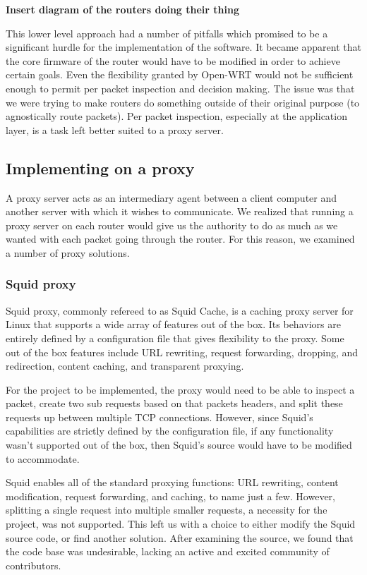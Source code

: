 \documentclass[12pt]{article}
\newcommand{\comment}[1]
{{\bfseries \color{blue} #1}}
\begin{document}
		\comment{Insert diagram of the routers doing their thing}

		This lower level approach had a number of pitfalls which promised to be a significant hurdle for the implementation of the software. It became apparent that the core firmware of the router would have to be modified in order to achieve certain goals. Even the flexibility granted by Open-WRT would not be sufficient enough to permit per packet inspection and decision making. The issue was that we were trying to make routers do something outside of their original purpose (to agnostically route packets). Per packet inspection, especially at the application layer, is a task left better suited to a proxy server.



	\subsection{Implementing on a proxy}

		A proxy server acts as an intermediary agent between a client computer and another server with which it wishes to communicate. We realized that running a proxy server on each router would give us the authority to do as much as we wanted with each packet going through the router. For this reason, we examined a number of proxy solutions. 

		\subsubsection{Squid proxy}

			Squid proxy, commonly refereed to as Squid Cache, is a caching proxy server for Linux that supports a wide array of features out of the box. Its behaviors are entirely defined by a configuration file that gives flexibility to the proxy. Some out of the box features include URL rewriting, request forwarding, dropping, and redirection, content caching, and transparent proxying.

			For the project to be implemented, the proxy would need to be able to inspect a packet, create two sub requests based on that packets headers, and split these requests up between multiple TCP connections. However, since Squid's capabilities are strictly defined by the configuration file, if any functionality wasn't supported out of the box, then Squid's source would have to be modified to accommodate.

			Squid enables all of the standard proxying functions: URL rewriting, content modification, request forwarding, and caching, to name just a few. However, splitting a single request into multiple smaller requests, a necessity for the project, was not supported. This left us with a choice to either modify the Squid source code, or find another solution. After examining the source, we found that the code base was undesirable, lacking an active and excited community of contributors.
\end{document}
